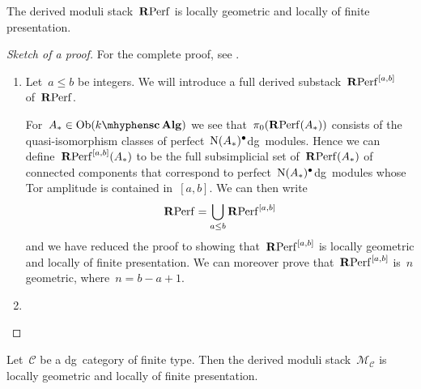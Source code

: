 \begin{refsection}
\begin{theorem}
  \label{theorem:main-theorem-RPerf}
  The derived moduli stack~$\mathbf{R}\mathrm{Perf}$ is locally geometric and locally of finite presentation.

  \begin{proof}[Sketch of a proof]
    For the complete proof, see \cite[proposition 3.7]{toen-vaquie}.
    \begin{enumerate}
      \item Let~$a\leq b$ be integers. We will introduce a full derived substack~$\mathbf{R}\mathrm{Perf}^{[a,b]}$ of~$\mathbf{R}\mathrm{Perf}$.
        
        For~$A_*\in\Ob(\scAlg{k})$ we see that~$\pi_0(\mathbf{R}\mathrm{Perf}(A_*))$ consists of the quasi-isomorphism classes of perfect~$\operatorname{N}(A_*)^\bullet$\dash dg~modules. Hence we can define~$\mathbf{R}\mathrm{Perf}^{[a,b]}(A_*)$ to be the full subsimplicial set of~$\mathbf{R}\mathrm{Perf}(A_*)$ of connected components that correspond to perfect~$\operatorname{N}(A_*)^\bullet$\dash dg~modules whose Tor amplitude is contained in~$[a,b]$. We can then write
        \begin{equation}
          \mathbf{R}\mathrm{Perf}=\bigcup_{a\leq b}\mathbf{R}\mathrm{Perf}^{[a,b]}
        \end{equation}
        and we have reduced the proof to showing that~$\mathbf{R}\mathrm{Perf}^{[a,b]}$ is locally geometric and locally of finite presentation. We can moreover prove that~$\mathbf{R}\mathrm{Perf}^{[a,b]}$ is~$n$\dash geometric, where~$n=b-a+1$.

      \item 
    \end{enumerate}
  \end{proof}
\end{theorem}

\begin{theorem}
  \label{theorem:main-theorem}
  Let~$\mathcal{C}$ be a dg~category of finite type. Then the derived moduli stack~$\mathcal{M}_{\mathcal{C}}$ is locally geometric and locally of finite presentation.
\end{theorem}


\end{refsection}

